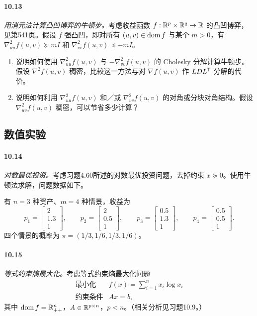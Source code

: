\paragraph{10.13} \emph{用消元法计算凸凹博弈的牛顿步。}考虑收益函数 $f:\mathbb R^p\times\mathbb R^q\to\mathbb R$ 的凸凹博弈，见第541页。假设 $f$ 强凸凹，即对所有 $(u,v)\in\operatorname{dom} f$ 与某个 $m>0$，有 $\nabla_{uu}^2f(u,v)\succeq mI$ 和 $\nabla_{vv}^2f(u,v)\preceq-mI$。
\begin{enumerate}[label=(\alph*)]
\item 说明如何使用 $\nabla_{uu}^2f(u,v)$ 与 $-\nabla_{vv}^2f(u,v)$ 的 Cholesky 分解计算牛顿步。假设 $\nabla^2f(u,v)$ 稠密，比较这一方法与对 $\nabla f(u,v)$ 作 $LDL^\mathsf T$ 分解的代价。
\item 说明如何利用 $\nabla_{uu}^2f(u,v)$ 和／或 $\nabla_{vv}^2f(u,v)$ 的对角或分块对角结构。假设 $\nabla_{uv}^2f(u,v)$ 稠密，可以节省多少计算？
\end{enumerate}

\subsection*{数值实验}
\paragraph{10.14} \emph{对数最优投资。}考虑习题4.60所述的对数最优投资问题，去掉约束 $x\succeq0$。使用牛顿法求解，问题数据如下。

有 $n=3$ 种资产、$m=4$ 种情景，收益为
\[p_1=\begin{bmatrix}2\\1.3\\1\end{bmatrix},\qquad p_2=\begin{bmatrix}2\\0.5\\1\end{bmatrix},\qquad p_3=\begin{bmatrix}0.5\\1.3\\1\end{bmatrix},\qquad p_4=\begin{bmatrix}0.5\\0.5\\1\end{bmatrix}.\]
四个情景的概率为 $\pi=(1/3,1/6,1/3,1/6)$。

\paragraph{10.15} \emph{等式约束熵最大化。}考虑等式约束熵最大化问题
\[\begin{array}{ll}\text{最小化}&f(x)=\displaystyle\sum_{i=1}^n x_i\log x_i\\\text{约束条件}&Ax=b,\end{array}\]
其中 $\operatorname{dom} f=\mathbb R_{++}^n$，$A\in\mathbb R^{p\times n}$，$p<n$。（相关分析见习题10.9。）

